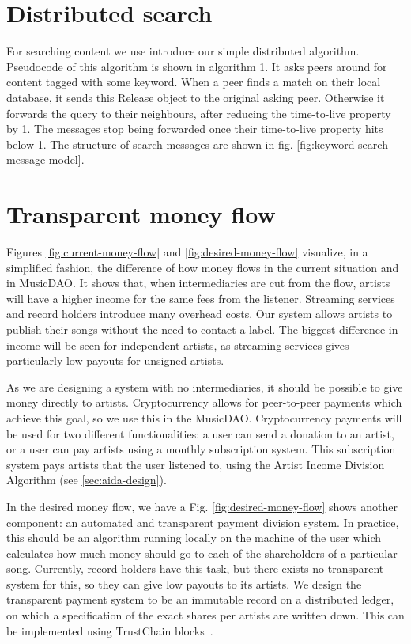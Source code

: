 \section{Distributed search}
For searching content we use introduce our simple distributed algorithm. Pseudocode of this algorithm is shown in algorithm 1. It asks peers around for content tagged with some keyword. When a peer finds a match on their local database, it sends this Release object to the original asking peer. Otherwise it forwards the query to their neighbours, after reducing the time-to-live property by 1. The messages stop being forwarded once their time-to-live property hits below 1. The structure of search messages are shown in fig. \ref{fig:keyword-search-message-model}.



\section{Transparent money flow}
Figures \ref{fig:current-money-flow} and \ref{fig:desired-money-flow} visualize, in a simplified fashion, the difference of how money flows in the current situation and in MusicDAO. It shows that, when intermediaries are cut from the flow, artists will have a higher income for the same fees from the listener. Streaming services and record holders introduce many overhead costs. Our system allows artists to publish their songs without the need to contact a label. The biggest difference in income will be seen for independent artists, as streaming services gives particularly low payouts for unsigned artists.

As we are designing a system with no intermediaries, it should be possible to give money directly to artists. Cryptocurrency allows for peer-to-peer payments which achieve this goal, so we use this in the MusicDAO. Cryptocurrency payments will be used for two different functionalities: a user can send a donation to an artist, or a user can pay artists using a monthly subscription system. This subscription system pays artists that the user listened to, using the Artist Income Division Algorithm (see \ref{sec:aida-design}). 

In the desired money flow, we have a  Fig. \ref{fig:desired-money-flow} shows another component: an automated and transparent payment division system. In practice, this should be an algorithm running locally on the machine of the user which calculates how much money should go to each of the shareholders of a particular song. Currently, record holders have this task, but there exists no transparent system for this, so they can give low payouts to its artists. We design the transparent payment system to be an immutable record on a distributed ledger, on which a specification of the exact shares per artists are written down. This can be implemented using TrustChain blocks~\citep{otte2017trustchain}.

